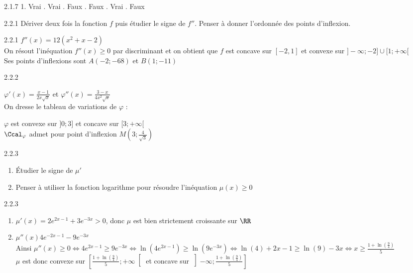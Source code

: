 \begin{Solution}{2.1.7}
	1. Vrai . Vrai . Faux . Faux . Vrai . Faux\\
\end{Solution}
\begin{Indication}{2.2.1}
Dériver deux fois la fonction $f$ puis étudier le signe de $f''$. Penser à donner l'ordonnée des points d'inflexion.
\end{Indication}
\begin{Solution}{2.2.1}
$f''(x)=12(x^2+x-2)$\\
On résout l'inéquation $f''(x)\geq0$ par discriminant et on obtient que $f$ est concave sur $[-2,1]$ et convexe sur $]-\infty;-2]\cup[1;+\infty[$\\
Ses points d'inflexions sont $A(-2;-68)$ et $B(1;-11)$
\end{Solution}
\begin{Solution}{2.2.2}
\begin{minipage}{0.5\linewidth}
$\varphi'(x)=\frac{x-1}{2x\sqrt{x}}$ et $\varphi''(x)=\frac{3-x}{4x^2\sqrt{x}}$\\
On dresse le tableau de variations de $\varphi$ :

\end{minipage}
\begin{minipage}{0.5\linewidth}
$\varphi$ est convexe sur $]0;3]$  et concave sur $[3;+\infty[$\\
$\Ccal_\varphi$ admet pour point d'inflexion $M\left(3;\frac{4}{\sqrt{3}}\right)$\\
\end{minipage}
\end{Solution}
\begin{Indication}{2.2.3}
	\begin{enumerate}
		\item Étudier le signe de $\mu'$
		\item Penser à utiliser la fonction logarithme pour résoudre l'inéquation $\mu(x)\geq0$
	\end{enumerate}
\end{Indication}
\begin{Solution}{2.2.3}
\begin{enumerate}
	\item $\mu'(x)=2e^{2x-1}+3e^{-3x}>0$, donc $\mu$ est bien strictement croissante sur $\RR$
	\item $\mu''(x)4e^{-2x-1}-9e^{-3x}$\\
	Ainsi $\mu''(x)\geq0\Leftrightarrow 4e^{2x-1}\geq9e^{-3x}\Leftrightarrow \ln\left(4e^{2x-1}\right)\geq\ln\left(9e^{-3x}\right)\Leftrightarrow \ln(4)+2x-1\geq\ln(9)-3x\Leftrightarrow x\geq\frac{1+\ln\left(\frac{9}{4}\right)}{5}$\\
	$\mu$ est donc convexe sur $\left[\frac{1+\ln\left(\frac{9}{4}\right)}{5};+\infty\right[$ et concave sur $\left]-\infty;\frac{1+\ln\left(\frac{9}{4}\right)}{5}\right]$
\end{enumerate}
\end{Solution}
